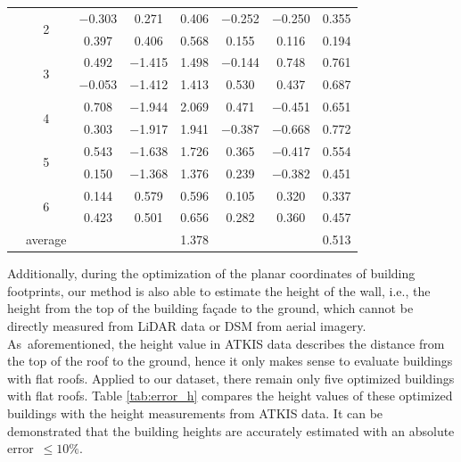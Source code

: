 \documentclass[remotesensing,article,accept,moreauthors,pdftex,10pt,a4paper]{mdpi}
\theoremstyle{mdpi}
\newcounter{re}
\begin{document}
\begin{table}[H]
\begin{tabular}{cccccccc}
\cline{2-8}          & \multirow{2}[2]{*}{2} & $-$0.303 & 0.271 & 0.406 & $-$0.252 & $-$0.250 & 0.355 \\
          &       & 0.397 & 0.406 & 0.568 & 0.155 & 0.116 & 0.194 \\
\cline{2-8}          & \multirow{2}[2]{*}{3} & 0.492 & $-$1.415 & 1.498 & $-$0.144 & 0.748 & 0.761 \\
          &       & $-$0.053 & $-$1.412 & 1.413 & 0.530 & 0.437 & 0.687 \\
\cline{2-8}          & \multirow{2}[2]{*}{4} & 0.708 & $-$1.944 & 2.069 & 0.471 & $-$0.451 & 0.651 \\
          &       & 0.303 & $-$1.917 & 1.941 & $-$0.387 & $-$0.668 & 0.772 \\
\cline{2-8}          & \multirow{2}[2]{*}{5} & 0.543 & $-$1.638 & 1.726 & 0.365 & $-$0.417 & 0.554 \\
          &       & 0.150 & $-$1.368 & 1.376 & 0.239 & $-$0.382 & 0.451 \\
\cline{2-8}          & \multirow{2}[2]{*}{6} & 0.144 & 0.579 & 0.596 & 0.105 & 0.320 & 0.337 \\
          &       & 0.423 & 0.501 & 0.656 & 0.282 & 0.360 & 0.457 \\
\cline{2-8}          & average  &       &       & 1.378 &       &       & 0.513 \\
    \bottomrule
    \end{tabular}%
  \label{tab:error_xy}%
\end{table}%


Additionally, during the optimization of the planar coordinates of building footprints, our method is also able to estimate the height of the wall, i.e., the height from the top of the building fa\c{c}ade to the ground, which cannot be directly measured from LiDAR data or DSM from aerial imagery. As~aforementioned, the height value in ATKIS data describes the distance from the top of the roof to the ground, hence it only makes sense to evaluate buildings with flat roofs. Applied to our dataset, there remain only five optimized buildings with flat roofs. Table \ref{tab:error_h} compares the height values of these optimized buildings with the height measurements from ATKIS data. It can be demonstrated that the building heights are accurately estimated with an absolute error~$\leq10\%$.
 
\end{document}
